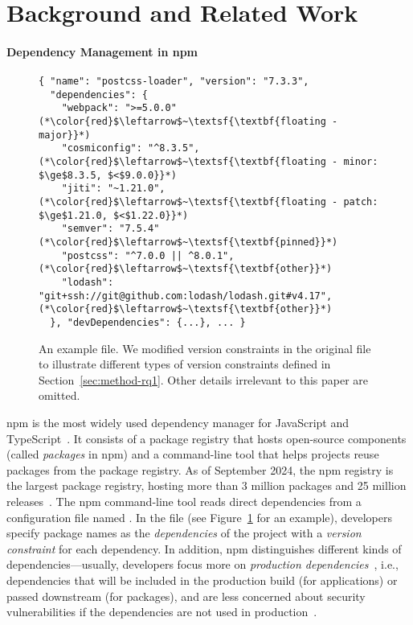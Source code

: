 \section{Background and Related Work}
\label{sec:background}

\paragraph{Dependency Management in npm}

\begin{figure}[b]
    \scriptsize
    \centering
\begin{lstlisting}[style=json,numbers=none]
{ "name": "postcss-loader", "version": "7.3.3",
  "dependencies": {
    "webpack": ">=5.0.0"     (*\color{red}$\leftarrow$~\textsf{\textbf{floating - major}}*)
    "cosmiconfig": "^8.3.5", (*\color{red}$\leftarrow$~\textsf{\textbf{floating - minor: $\ge$8.3.5, $<$9.0.0}}*)
    "jiti": "~1.21.0",       (*\color{red}$\leftarrow$~\textsf{\textbf{floating - patch: $\ge$1.21.0, $<$1.22.0}}*)
    "semver": "7.5.4"        (*\color{red}$\leftarrow$~\textsf{\textbf{pinned}}*)
    "postcss": "^7.0.0 || ^8.0.1", (*\color{red}$\leftarrow$~\textsf{\textbf{other}}*)
    "lodash": "git+ssh://git@github.com:lodash/lodash.git#v4.17", (*\color{red}$\leftarrow$~\textsf{\textbf{other}}*)
  }, "devDependencies": {...}, ... }
\end{lstlisting}
\caption{
An example  file. 
We modified version constraints in the original file to illustrate different types of version constraints defined in Section~\ref{sec:method-rq1}. Other details irrelevant to this paper are omitted.}
\label{fig:example-pkgjson}
\end{figure}

npm is the most widely used dependency manager for  JavaScript and TypeScript~\cite{npm}.
It consists of a package registry that hosts open-source components (called \emph{packages} in npm) and a command-line tool that helps projects reuse packages from the package registry.  
As of September 2024, the npm registry is the largest package registry, hosting more than 3 million packages and 25 million releases~\cite{module-counts}.
The npm command-line tool reads direct dependencies from a configuration file named .
In the  file (see Figure~\ref{fig:example-pkgjson} for an example), developers specify package names as the \emph{dependencies} of the project with a \emph{version constraint} for each dependency.
In addition, npm distinguishes different kinds of dependencies---usually, developers focus more on \emph{production dependencies}~\cite{DBLP:conf/kbse/LatendresseMCS22}, i.e., dependencies that will be included in the production build (for applications) or passed downstream (for packages), and are less concerned about security vulnerabilities if the dependencies are not used in production~\cite{DBLP:conf/esem/PashchenkoPPSM18, DBLP:conf/kbse/LatendresseMCS22}.

